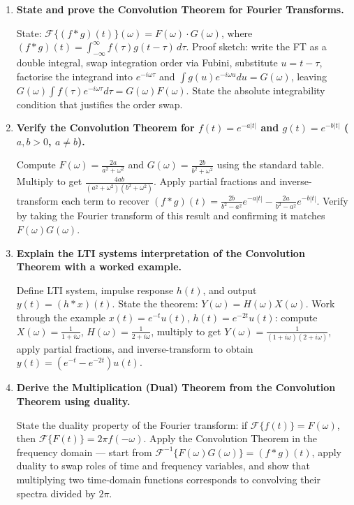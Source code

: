 \documentclass[12pt,a4paper]{article}
\begin{document}
\begin{enumerate}[label=\textbf{Q\arabic*.}, leftmargin=*, itemsep=8pt]

\item \textbf{State and prove the Convolution Theorem for Fourier Transforms.}

  State: $\mathcal{F}\{(f*g)(t)\}(\omega) = F(\omega)\cdot G(\omega)$, where
  $(f*g)(t) = \int_{-\infty}^{\infty}f(\tau)g(t-\tau)\,d\tau$.
  Proof sketch: write the FT as a double integral, swap integration order via
  Fubini, substitute $u=t-\tau$, factorise the integrand into $e^{-i\omega\tau}$
  and $\int g(u)e^{-i\omega u}du = G(\omega)$, leaving $G(\omega)\int f(\tau)
  e^{-i\omega\tau}d\tau = G(\omega)F(\omega)$. State the absolute integrability
  condition that justifies the order swap.

\item \textbf{Verify the Convolution Theorem for $f(t)=e^{-a|t|}$ and $g(t)=e^{-b|t|}$
  ($a,b>0$, $a\neq b$).}

  Compute $F(\omega)=\frac{2a}{a^2+\omega^2}$ and $G(\omega)=\frac{2b}{b^2+\omega^2}$
  using the standard table. Multiply to get $\frac{4ab}{(a^2+\omega^2)(b^2+\omega^2)}$.
  Apply partial fractions and inverse-transform each term to recover
  $(f*g)(t) = \frac{2b}{b^2-a^2}e^{-a|t|} - \frac{2a}{b^2-a^2}e^{-b|t|}$.
  Verify by taking the Fourier transform of this result and confirming it matches
  $F(\omega)G(\omega)$.

\item \textbf{Explain the LTI systems interpretation of the Convolution Theorem with a worked
  example.}

  Define LTI system, impulse response $h(t)$, and output $y(t)=(h*x)(t)$. State
  the theorem: $Y(\omega)=H(\omega)X(\omega)$. Work through the example $x(t)=
  e^{-t}u(t)$, $h(t)=e^{-2t}u(t)$: compute $X(\omega)=\frac{1}{1+i\omega}$,
  $H(\omega)=\frac{1}{2+i\omega}$, multiply to get $Y(\omega)=\frac{1}{(1+i\omega)
  (2+i\omega)}$, apply partial fractions, and inverse-transform to obtain
  $y(t)=(e^{-t}-e^{-2t})u(t)$.

\item \textbf{Derive the Multiplication (Dual) Theorem from the Convolution Theorem using
  duality.}

  State the duality property of the Fourier transform: if $\mathcal{F}\{f(t)\}=
  F(\omega)$, then $\mathcal{F}\{F(t)\}=2\pi f(-\omega)$. Apply the Convolution
  Theorem in the frequency domain --- start from $\mathcal{F}^{-1}\{F(\omega)
  G(\omega)\}= (f*g)(t)$, apply duality to swap roles of time and frequency
  variables, and show that multiplying two time-domain functions corresponds
  to convolving their spectra divided by $2\pi$.


\end{enumerate}
\end{document}
